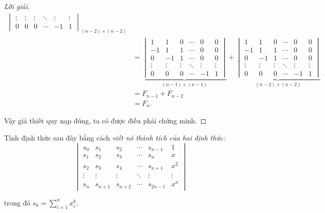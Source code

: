 \begin{proof}[Lời giải]
\begin{align*}
{\begin{vmatrix}
                            \vdots & \vdots & \vdots & \ddots & \vdots & \vdots \\
                            0      & 0      & 0      & \cdots & -1     & 1
                        \end{vmatrix}}_{(n-2)\times (n-2)} \\
         & =
        \underbrace{\begin{vmatrix}
                            1      & 1      & 0      & \cdots & 0      & 0      \\
                            -1     & 1      & 1      & \cdots & 0      & 0      \\
                            0      & -1     & 1      & \cdots & 0      & 0      \\
                            \vdots & \vdots & \vdots & \ddots & \vdots & \vdots \\
                            0      & 0      & 0      & \cdots & -1     & 1
                        \end{vmatrix}}_{(n-1)\times (n-1)}
        +
        \underbrace{\begin{vmatrix}
                            1      & 1      & 0      & \cdots & 0      & 0      \\
                            -1     & 1      & 1      & \cdots & 0      & 0      \\
                            0      & -1     & 1      & \cdots & 0      & 0      \\
                            \vdots & \vdots & \vdots & \ddots & \vdots & \vdots \\
                            0      & 0      & 0      & \cdots & -1     & 1
                        \end{vmatrix}}_{(n-2)\times (n-2)} \\
         & = F_{n-1} + F_{n-2}                                          \\
         & = F_{n}.
    \end{align*}
    \endgroup{}
    
    Vậy giả thiết quy nạp đúng, ta có được điều phải chứng minh.
\end{proof}

\begin{exercise}
    Tính định thức sau đây bằng cách \textit{viết nó thành tích của hai định thức:}
    \[
        \begin{vmatrix}
            s_{0}  & s_{1}   & s_{2}   & \cdots & s_{n-1}  & 1      \\
            s_{1}  & s_{2}   & s_{3}   & \cdots & s_{n}    & x      \\
            s_{2}  & s_{3}   & s_{4}   & \cdots & s_{n+1}  & x^{2}  \\
            \vdots & \vdots  & \vdots  & \ddots & \vdots   & \vdots \\
            s_{n}  & s_{n+1} & s_{n+2} & \cdots & s_{2n-1} & x^{n}
        \end{vmatrix}
    \]
    
    trong đó $s_{k} = \displaystyle\sum^{n}_{i=1}x_{i}^{k}$.
\end{exercise}

